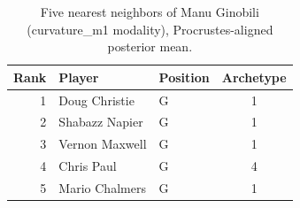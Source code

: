 \begin{table}[htbp]
  \centering\small
  \begin{tabular}{rllc}
    \toprule
    Rank & Player & Position & Archetype \\
    \midrule
    1 & Doug Christie & G & 1 \\
    2 & Shabazz Napier & G & 1 \\
    3 & Vernon Maxwell & G & 1 \\
    4 & Chris Paul & G & 4 \\
    5 & Mario Chalmers & G & 1 \\
    \bottomrule
  \end{tabular}
  \caption{Five nearest neighbors of Manu Ginobili (curvature_m1 modality), Procrustes-aligned posterior mean.}
  \label{tab:Manu_Ginobili_neighbors_curvature_m1}
\end{table}

